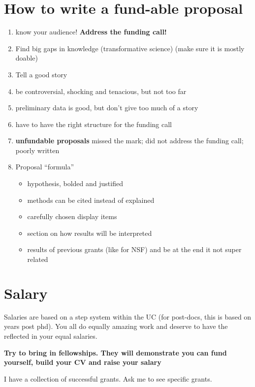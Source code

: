 \documentclass[12pt]{article}
\begin{document}
\section{How to write a fund-able proposal}

\begin{enumerate}
\item know your audience! \textbf{Address the funding call!}
\item Find big gaps in knowledge (transformative science) (make sure
  it is mostly doable)
\item Tell a good story
\item be controversial, shocking and tenacious, but not too far
\item preliminary data is good, but don't give too much of a story
\item have to have the right structure for the funding call
\item \textbf{unfundable proposals} missed the mark; did not address
  the funding call; poorly written
\item Proposal ``formula''
  \begin{itemize}
  \item hypothesis, bolded and justified
  \item methods can be cited instead of explained
  \item carefully chosen display items
  \item section on how results will be interpreted
  \item results of previous grants (like for NSF) and be at the end it
    not super related
  \end{itemize}
\end{enumerate}

\section{Salary}
Salaries are based on a step system within the UC (for post-docs, this
is based on years post phd). You all do equally amazing work and
deserve to have the reflected in your equal salaries. 

\textbf{Try to bring in fellowships. They will demonstrate you can
  fund yourself, build your CV and raise your salary}

I have a collection of successful grants. Ask me to see specific
grants.
\end{document}

